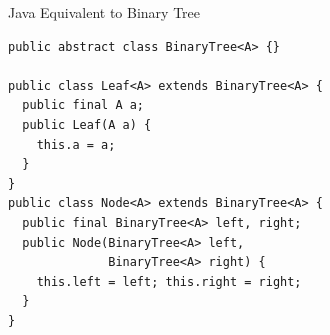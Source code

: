 \documentclass{beamer}
\begin{document}
\begin{frame}[fragile]{Java Equivalent to Binary Tree}
\begin{lstlisting}[style=Java]
public abstract class BinaryTree<A> {}

public class Leaf<A> extends BinaryTree<A> {
  public final A a;
  public Leaf(A a) {
    this.a = a;
  }
}
public class Node<A> extends BinaryTree<A> {
  public final BinaryTree<A> left, right;
  public Node(BinaryTree<A> left,
              BinaryTree<A> right) {
    this.left = left; this.right = right;
  }
}
\end{lstlisting}
\end{frame}
\end{document}
